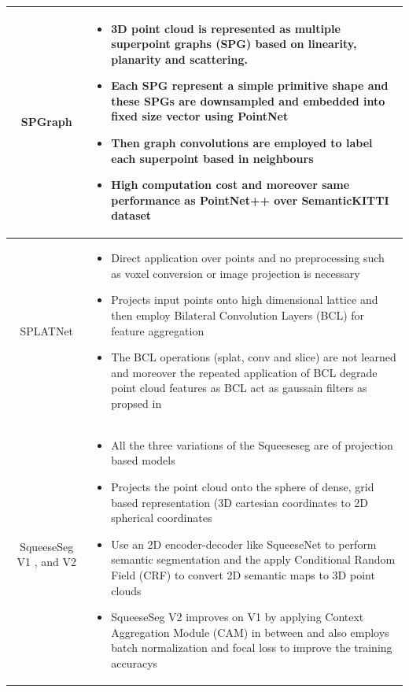 \documentclass[12pt]{article}
\begin{document}
\begin{longtable}{|c|L|}
       SPGraph \cite{002} & \begin{itemize}
           \item 3D point cloud is represented as multiple superpoint graphs (SPG) based on linearity, planarity and scattering.
           \item Each SPG represent a simple primitive shape and these SPGs are downsampled and embedded into fixed size vector using PointNet
           \item Then graph convolutions are employed to label each superpoint based in neighbours
           \item High computation cost and moreover same performance as PointNet++ over SemanticKITTI dataset
       \end{itemize} \\ \hline
       
       SPLATNet \cite{003} & \begin{itemize}
           \item Direct application over points and no preprocessing such as voxel conversion or image projection is necessary
           \item Projects input points onto high dimensional lattice and then employ Bilateral Convolution Layers (BCL) for feature aggregation
           \item The BCL operations (splat, conv and slice) are not learned and moreover the repeated application of BCL degrade point cloud features as BCL act as gaussain filters as propsed in \cite{004}
       \end{itemize} \\ \hline
       
       SqueeseSeg V1 \cite{sseg}, and V2 \cite{ssegv2} & \begin{itemize}
           \item All the three variations of the Squeeseseg are of projection based models
           \item Projects the point cloud onto the sphere of dense, grid based representation (3D cartesian coordinates to 2D spherical coordinates
           \item Use an 2D encoder-decoder like SqueeseNet to perform semantic segmentation and the apply Conditional Random Field (CRF) to convert 2D semantic maps to 3D point clouds
           \item SqueeseSeg V2 improves on V1 by applying Context Aggregation Module (CAM) in between and also employs batch normalization and focal loss to improve the training accuracys
       \end{itemize} \\ \hline
       

\end{longtable}
\end{document}
